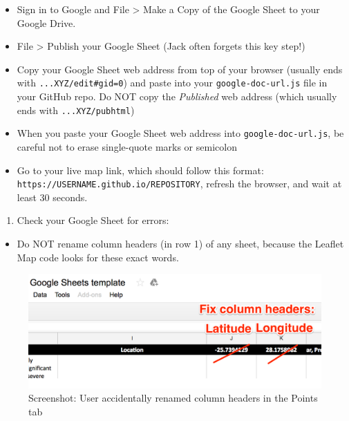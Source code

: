 \documentclass[
  english,
]{book}
\providecommand{\tightlist}{%
  \setlength{\itemsep}{0pt}\setlength{\parskip}{0pt}}
\begin{document}
\begin{itemize}
\tightlist
\item
  Sign in to Google and File \textgreater{} Make a Copy of the Google Sheet to your Google Drive.
\item
  File \textgreater{} Publish your Google Sheet (Jack often forgets this key step!)
\item
  Copy your Google Sheet web address from top of your browser (usually ends with \texttt{...XYZ/edit\#gid=0}) and paste into your \texttt{google-doc-url.js} file in your GitHub repo. Do NOT copy the \emph{Published} web address (which usually ends with \texttt{...XYZ/pubhtml})
\item
  When you paste your Google Sheet web address into \texttt{google-doc-url.js}, be careful not to erase single-quote marks or semicolon
\item
  Go to your live map link, which should follow this format: \texttt{https://USERNAME.github.io/REPOSITORY}, refresh the browser, and wait at least 30 seconds.
\end{itemize}

\begin{enumerate}
\def\labelenumi{\arabic{enumi})}
\setcounter{enumi}{1}
\tightlist
\item
  Check your Google Sheet for errors:
\end{enumerate}

\begin{itemize}
\tightlist
\item
  Do NOT rename column headers (in row 1) of any sheet, because the Leaflet Map code looks for these exact words.
\end{itemize}

\begin{figure}
\centering
\includegraphics{images/08-github/lmwgs-fix-column-headers.png}
\caption{Screenshot: User accidentally renamed column headers in the Points tab}
\end{figure}
\end{document}
